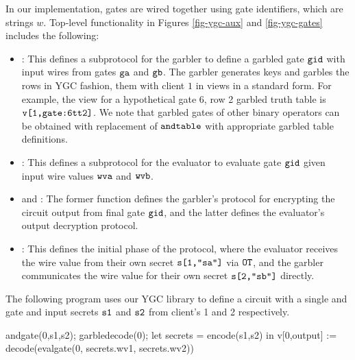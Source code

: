 In our implementation, gates are wired together using gate
identifiers, which are strings $w$. Top-level functionality in Figures
\ref{fig-ygc-aux} and \ref{fig-ygc-gates} includes the following:
\begin{itemize}
\item {}: This defines a subprotocol for the garbler
  to define a garbled gate $\texttt{gid}$ with input wires from gates
  $\texttt{ga}$ and $\texttt{gb}$. The garbler generates keys and garbles
  the rows in YGC fashion, them with client $1$ in
  views in a standard form. For example, the view for
  a hypothetical gate 6, row 2 garbled truth table is $\texttt{v[1,gate:6tt2]}$.
  We note that garbled gates of other binary operators can be obtained with
  replacement of $\texttt{andtable}$ with appropriate garbled table definitions. 
\item {}: This defines a subprotocol for the evaluator to
  evaluate gate $\texttt{gid}$ given input wire values $\texttt{wva}$ and
  $\texttt{wvb}$.
\item {} and : The former function
  defines the garbler's protocol for encrypting the circuit
  output from final gate $\texttt{gid}$, and the latter defines
  the evaluator's output decryption protocol.
\item {}: This defines the initial phase of the protocol,
  where the evaluator receives the wire value from their own
  secret $\texttt{s[1,"sa"]}$ via $\texttt{OT}$, and the garbler communicates
  the wire value for their own secret $\texttt{s[2,"sb"]}$ directly.
\end{itemize}
\begin{example}
  \label{example-ygc-andcircuit}
The following program uses our YGC library to define
a circuit with a single and gate and input secrets $\texttt{s1}$ and
$\texttt{s2}$ from client's 1 and 2 respectively. 
\begin{verbatimtab}
  andgate(0,s1,s2);
  garbledecode(0);
  let secrets = encode(s1,s2) in
  v[0,output] := decode(evalgate(0, secrets.wv1, secrets.wv2))
\end{verbatimtab}
\end{example}

